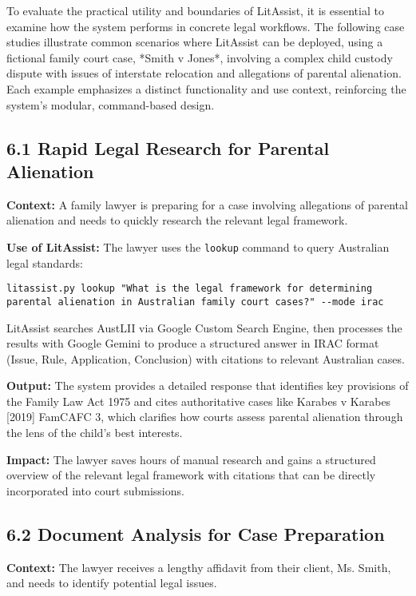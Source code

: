 \documentclass[12pt,a4paper]{article}
\begin{document}
To evaluate the practical utility and boundaries of LitAssist, it is essential to examine how the system performs in concrete legal workflows. The following case studies illustrate common scenarios where LitAssist can be deployed, using a fictional family court case, *Smith v Jones*, involving a complex child custody dispute with issues of interstate relocation and allegations of parental alienation. Each example emphasizes a distinct functionality and use context, reinforcing the system's modular, command-based design.

\subsection*{6.1 Rapid Legal Research for Parental Alienation}

\textbf{Context:} A family lawyer is preparing for a case involving allegations of parental alienation and needs to quickly research the relevant legal framework.

\textbf{Use of LitAssist:} The lawyer uses the \texttt{lookup} command to query Australian legal standards:

\begin{verbatim}
litassist.py lookup "What is the legal framework for determining 
parental alienation in Australian family court cases?" --mode irac
\end{verbatim}

LitAssist searches AustLII via Google Custom Search Engine, then processes the results with Google Gemini to produce a structured answer in IRAC format (Issue, Rule, Application, Conclusion) with citations to relevant Australian cases.

\textbf{Output:} The system provides a detailed response that identifies key provisions of the Family Law Act 1975 and cites authoritative cases like Karabes v Karabes [2019] FamCAFC 3, which clarifies how courts assess parental alienation through the lens of the child's best interests.

\textbf{Impact:} The lawyer saves hours of manual research and gains a structured overview of the relevant legal framework with citations that can be directly incorporated into court submissions.

\subsection*{6.2 Document Analysis for Case Preparation}

\textbf{Context:} The lawyer receives a lengthy affidavit from their client, Ms. Smith, and needs to identify potential legal issues.
\end{document}
